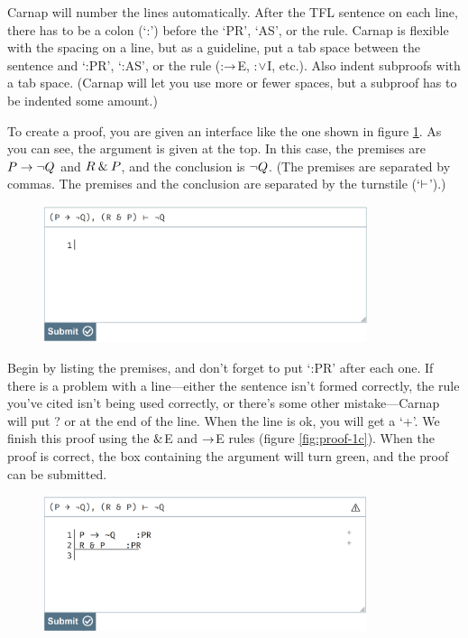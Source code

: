 Carnap will number the lines automatically. After the TFL  sentence on each line, there has to be a colon (`:') before the `PR', `AS', or the rule. Carnap is flexible with the spacing on a line, but as a guideline, put a tab space between the sentence and `:PR', `:AS', or the rule (:$\rightarrow$E, :$\vee$I, etc.). Also indent subproofs with a tab space. (Carnap will let you use more or fewer spaces, but a subproof has to be indented some amount.)

To create a proof, you are given an interface like the one shown in figure \ref{fig:proof-1a}. As you can see, the argument is given at the top. In this case, the premises are $P \rightarrow {\neg} Q$ and $R \mathbin{\&} P$, and the conclusion is ${\neg} Q$. (The premises are separated by commas. The premises and the conclusion are separated by the turnstile (`$\vdash$').)

\begin{figure}
\includegraphics[width=9.5cm]{textbook--1a.PNG}
\caption{}
\label{fig:proof-1a}
\end{figure}

Begin by listing the premises, and don't forget to put `:PR' after each one. If there is a problem with a line---either the sentence isn't formed correctly, the rule you've cited isn't being used correctly, or there's some other mistake---Carnap will put \textsf{?} or {\selectfont{}\relax}  at the end of the line. When the line is ok, you will get a `+'.
We finish this proof using the $\mathbin{\&}$E and $\rightarrow$E rules (figure \ref{fig:proof-1c}). When the proof is correct, the box containing the argument will turn green, and the proof can be submitted. 

\begin{figure}[h]
\includegraphics[width=9.5cm]{textbook--1b.PNG}
\caption{}
\label{fig:proof-1b}
\end{figure}


